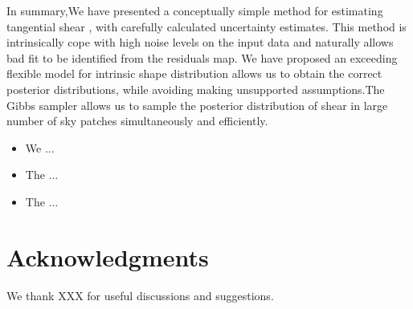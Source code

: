 \documentclass[useAMS,usenatbib]{mn2e}
\begin{document}
\label{sec:conclusions}

In summary,We have presented a conceptually simple method for estimating
tangential shear , with carefully calculated uncertainty estimates.
This method is intrinsically cope with high noise levels on the input
data and naturally allows bad fit to be identified from the residuals
map. We have proposed an exceeding flexible model for intrinsic shape
distribution allows us to obtain the correct posterior distributions,
while avoiding making unsupported assumptions.The Gibbs sampler allows
us to sample the posterior distribution of shear in large number of
sky patches simultaneously and efficiently.
\begin{itemize}
\item We ...
\item The ...
\item The ...
\end{itemize}



\section*{Acknowledgments}

We thank XXX for useful discussions and suggestions.



% 
% 
% 
% 






 





\label{lastpage} \bsp
\end{document}
